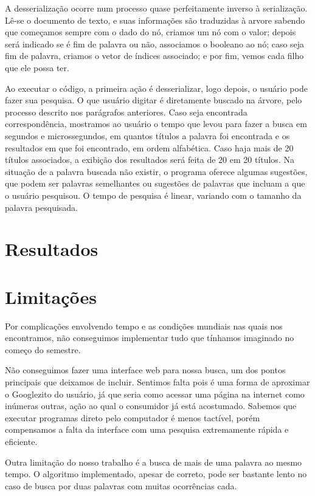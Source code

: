 \documentclass{article}
\begin{document}
A desserialização ocorre num processo quase perfeitamente inverso à serialização. Lê-se o documento de texto, e suas informações são traduzidas à arvore sabendo que começamos sempre com o dado do nó, criamos um nó com o valor; depois será indicado se é fim de palavra ou não, associamos o booleano ao nó; caso seja fim de palavra, criamos o vetor de índices associado; e por fim, vemos cada filho que ele possa ter.

Ao executar o código, a primeira ação é desserializar, logo depois, o usuário pode fazer sua pesquisa. O que usuário digitar é diretamente buscado na árvore, pelo processo descrito nos parágrafos anteriores. Caso seja encontrada correspondência, mostramos ao usuário o tempo que levou para fazer a busca em segundos e microssegundos, em quantos títulos a palavra foi encontrada e os resultados em que foi encontrado, em ordem alfabética. Caso haja mais de 20 títulos associados, a exibição dos resultados será feita de 20 em 20 títulos. Na situação de a palavra buscada não existir, o programa oferece algumas sugestões, que podem ser palavras semelhantes ou sugestões de palavras que incluam a que o usuário pesquisou. O tempo de pesquisa é linear, variando com o tamanho da palavra pesquisada.

\section{Resultados}

\section{Limitações}

Por complicações envolvendo tempo e as condições mundiais nas quais nos encontramos, não conseguimos implementar tudo que tínhamos imaginado no começo do semestre. 

Não conseguimos fazer uma interface web para nossa busca, um dos pontos principais que deixamos de incluir. Sentimos falta pois é uma forma de aproximar o Googlezito do usuário, já que seria como acessar uma página na internet como inúmeras outras, ação ao qual o consumidor já está acostumado. Sabemos que executar programas direto pelo computador é menos tactível, porém compensamos a falta da interface com uma pesquisa extremamente rápida e eficiente.

Outra limitação do nosso trabalho é a busca de mais de uma palavra ao mesmo tempo. O algoritmo implementado, apesar de correto, pode ser bastante lento no caso de busca por duas palavras com muitas ocorrências cada. 
\end{document}
